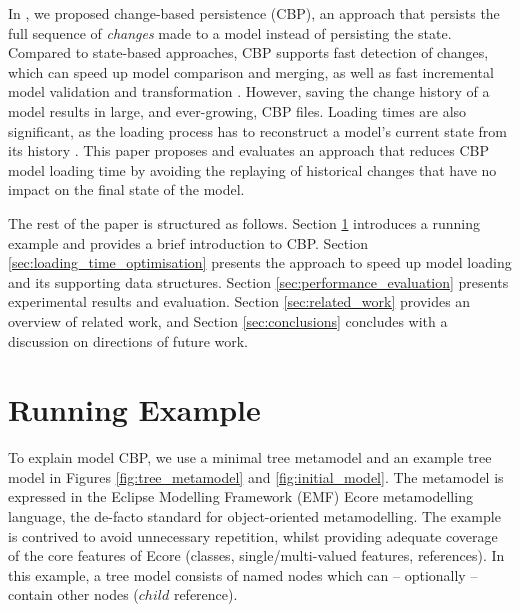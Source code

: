 \documentclass{llncs}
\begin{document}
In \cite{yohannis2017turning}, we proposed change-based persistence (CBP), an approach that persists the full sequence of \emph{changes} made to a model instead of persisting the state. Compared to state-based approaches, CBP supports fast detection of changes, which can speed up model comparison and merging, as well as fast incremental model validation and transformation \cite{rath2012derived,ogunyomi2015property}. However, saving the change history of a model results in large, and ever-growing, CBP files.  Loading times are also significant, as the loading process has to reconstruct a model's current state from its history \cite{yohannis2017turning}. This paper proposes and evaluates an approach that reduces CBP model loading time by avoiding the replaying of historical changes that have no impact on the final state of the model.

The rest of the paper is structured as follows. Section \ref{sec:case_study} introduces a running example and provides a brief introduction to CBP.
Section \ref{sec:loading_time_optimisation} presents the approach to speed up model loading and its supporting data structures. Section \ref{sec:performance_evaluation} presents experimental results and evaluation. Section \ref{sec:related_work} provides an overview of related work, and Section \ref{sec:conclusions} concludes with a discussion on directions of future work.

\vspace{-15pt}
\section{Running Example}
\label{sec:case_study}
\vspace{-10pt}
To explain model CBP, we use a minimal tree metamodel and an example tree model in Figures \ref{fig:tree_metamodel} and \ref{fig:initial_model}.
The metamodel is expressed in the Eclipse Modelling Framework (EMF) Ecore metamodelling language, the de-facto standard for object-oriented metamodelling.  The example is contrived to avoid unnecessary repetition, whilst providing adequate coverage of the core features of Ecore (classes, single/multi-valued features, references).
In this example, a tree model consists of named nodes which can -- optionally -- contain other nodes ($child$ reference).
\end{document}
